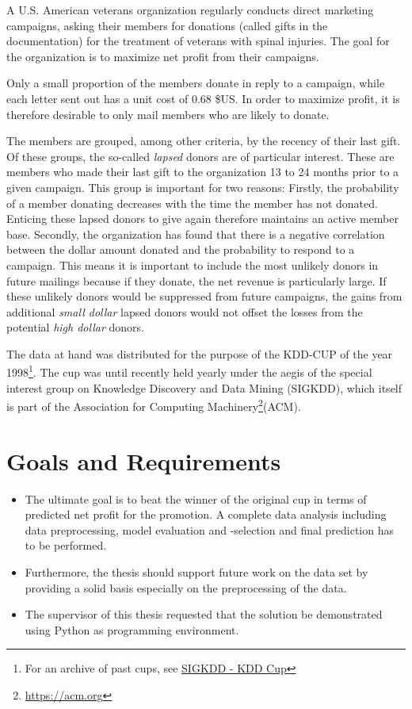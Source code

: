 \documentclass[
  11pt,
  a4paper,
  DIV=12,captions=tableheading,oneside,titlepage]{scrbook}
\providecommand{\tightlist}{%
  \setlength{\itemsep}{0pt}\setlength{\parskip}{0pt}}
\begin{document}
A U.S. American veterans organization regularly conducts direct marketing campaigns, asking their members for donations (called gifts in the documentation) for the treatment of veterans with spinal injuries. The goal for the organization is to maximize net profit from their campaigns.

Only a small proportion of the members donate in reply to a campaign, while each letter sent out has a unit cost of 0.68 \$US. In order to maximize profit, it is therefore desirable to only mail members who are likely to donate.

The members are grouped, among other criteria, by the recency of their last gift. Of these groups, the so-called \emph{lapsed} donors are of particular interest. These are members who made their last gift to the organization 13 to 24 months prior to a given campaign. This group is important for two reasons: Firstly, the probability of a member donating decreases with the time the member has not donated. Enticing these lapsed donors to give again therefore maintains an active member base. Secondly, the organization has found that there is a negative correlation between the dollar amount donated and the probability to respond to a campaign. This means it is important to include the most unlikely donors in future mailings because if they donate, the net revenue is particularly large. If these unlikely donors would be suppressed from future campaigns, the gains from additional \emph{small dollar} lapsed donors would not offset the losses from the potential \emph{high dollar} donors.

The data at hand was distributed for the purpose of the KDD-CUP of the year 1998\footnote{For an archive of past cups, see \href{http://www.kdd.org/kdd-cup}{SIGKDD - KDD Cup}}. The cup was until recently held yearly under the aegis of the special interest group on Knowledge Discovery and Data Mining (SIGKDD), which itself is part of the Association for Computing Machinery\footnote{\url{https://acm.org}}(ACM).

\hypertarget{goals-and-requirements}{%
\section{Goals and Requirements}\label{goals-and-requirements}}

\begin{itemize}
\tightlist
\item
  The ultimate goal is to beat the winner of the original cup in terms of predicted net profit for the promotion. A complete data analysis including data preprocessing, model evaluation and -selection and final prediction has to be performed.
\item
  Furthermore, the thesis should support future work on the data set by providing a solid basis especially on the preprocessing of the data.
\item
  The supervisor of this thesis requested that the solution be demonstrated using Python as programming environment.
\end{itemize}
\end{document}

